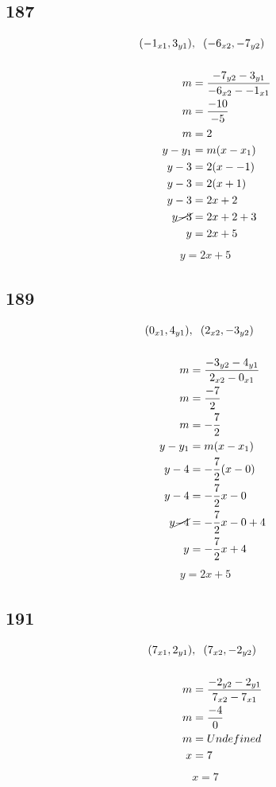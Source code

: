 \documentclass{article}
\begin{document}
    \subsection*{187}
    \begin{align*}
    (-1_{x1}, 3_{y1})&,\hspace{.2cm} (-6_{x2}, -7_{y2}) \\
    \\
    m &= \frac{-7_{y2} -  3_{y1}}{-6_{x2} - -1_{x1}} \\
    m &= \frac{-10}{-5} \\
    m &= 2\\
    y - y_{1} &= m(x - x_{1})\\
    y - 3 &= 2(x - -1) \\
    y - 3 &= 2(x +1) \\
    y - 3 &= 2x + 2 \\
    y \cancel{-3} &= 2x + 2 + 3\\
    y &= 2x + 5
    \end{align*}
    \begin{align*}
        \boxed{ y = 2x + 5}
    \end{align*}

    \subsection*{189}
    \begin{align*}
    (0_{x1}, 4_{y1})&,\hspace{.2cm} (2_{x2}, -3_{y2}) \\
    \\
    m &= \frac{-3_{y2} -  4_{y1}}{2_{x2} - 0_{x1}} \\
    m &= \frac{-7}{2} \\
    m &= -\frac{7}{2}\\
    y - y_{1} &= m(x - x_{1})\\
    y - 4 &= -\frac{7}{2}(x - 0) \\
    y - 4 &= -\frac{7}{2}x - 0 \\
    y \cancel{-4} &= -\frac{7}{2}x - 0 + 4 \\
    y &= -\frac{7}{2}x + 4
    \end{align*}
    \begin{align*}
        \boxed{ y = 2x + 5}
    \end{align*}

    \subsection*{191}
    \begin{align*}
    (7_{x1}, 2_{y1})&,\hspace{.2cm} (7_{x2}, -2_{y2}) \\
    \\
    m &= \frac{-2_{y2} -  2_{y1}}{7_{x2} - 7_{x1}} \\
    m &= \frac{-4}{0} \\
    m &= Undefined\\
    x & = 7
    \end{align*}
    \begin{align*}
        \boxed{x  = 7}
    \end{align*}
\end{document}
